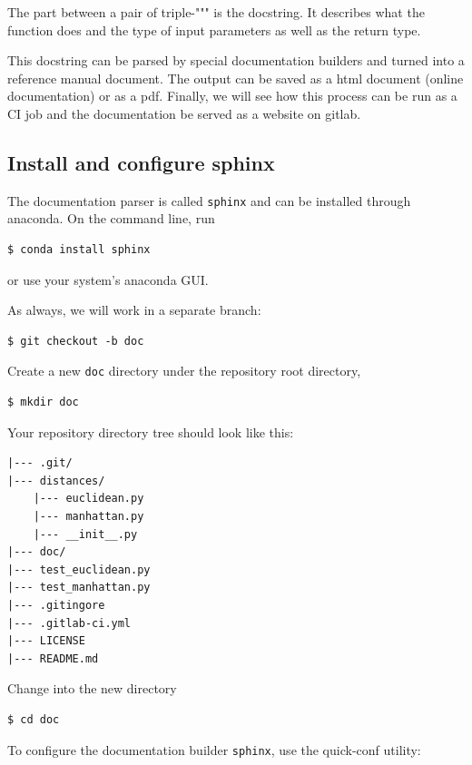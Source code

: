 \documentclass[11pt]{article}
\begin{document}
The part between a pair of triple-""" is the docstring. It describes
what the function does and the type of input parameters as well as the
return type.

This docstring can be parsed by special documentation builders and
turned into a reference manual document. The output can be saved as a
html document (online documentation) or as a pdf. Finally, we will see
how this process can be run as a CI job and the documentation be served
as a website on gitlab.

\hypertarget{install-and-configure-sphinx}{%
\subsection{Install and configure
sphinx}\label{install-and-configure-sphinx}}

The documentation parser is called \texttt{sphinx} and can be installed
through anaconda. On the command line, run

\begin{verbatim}
$ conda install sphinx
\end{verbatim}

or use your system's anaconda GUI.

As always, we will work in a separate branch:

\begin{verbatim}
$ git checkout -b doc
\end{verbatim}

Create a new \texttt{doc} directory under the repository root directory,

\begin{verbatim}
$ mkdir doc
\end{verbatim}

Your repository directory tree should look like this:

\begin{verbatim}
|--- .git/
|--- distances/
    |--- euclidean.py
    |--- manhattan.py
    |--- __init__.py
|--- doc/
|--- test_euclidean.py
|--- test_manhattan.py
|--- .gitingore
|--- .gitlab-ci.yml
|--- LICENSE   
|--- README.md
\end{verbatim}

Change into the new directory

\begin{verbatim}
$ cd doc
\end{verbatim}

To configure the documentation builder \texttt{sphinx}, use the
quick-conf utility:
\end{document}
